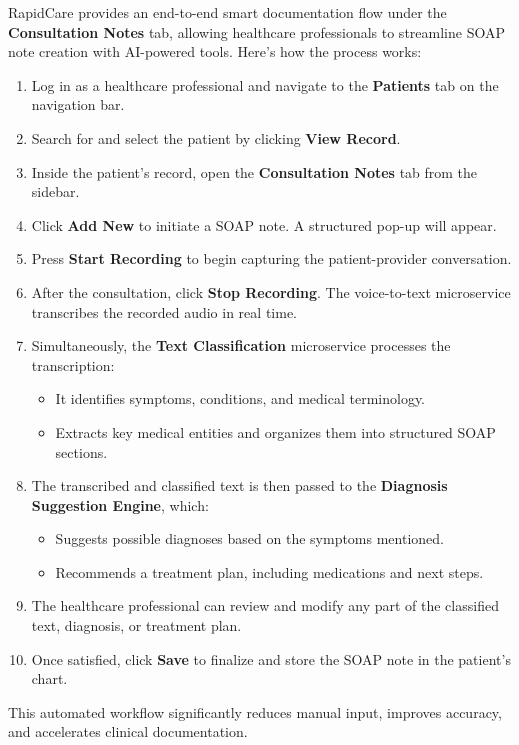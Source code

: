 \documentclass[12pt, titlepage]{article}
\begin{document}
RapidCare provides an end-to-end smart documentation flow under the \textbf{Consultation Notes} tab, allowing healthcare professionals to streamline SOAP note creation with AI-powered tools. Here’s how the process works:

\begin{enumerate}
    \item Log in as a healthcare professional and navigate to the \textbf{Patients} tab on the navigation bar.
    \item Search for and select the patient by clicking \textbf{View Record}.
    \item Inside the patient’s record, open the \textbf{Consultation Notes} tab from the sidebar.
    \item Click \textbf{Add New} to initiate a SOAP note. A structured pop-up will appear.
    \item Press \textbf{Start Recording} to begin capturing the patient-provider conversation.
    \item After the consultation, click \textbf{Stop Recording}. The voice-to-text microservice transcribes the recorded audio in real time.
    \item Simultaneously, the \textbf{Text Classification} microservice processes the transcription:
    \begin{itemize}
        \item It identifies symptoms, conditions, and medical terminology.
        \item Extracts key medical entities and organizes them into structured SOAP sections.
    \end{itemize}
    \item The transcribed and classified text is then passed to the \textbf{Diagnosis Suggestion Engine}, which:
    \begin{itemize}
        \item Suggests possible diagnoses based on the symptoms mentioned.
        \item Recommends a treatment plan, including medications and next steps.
    \end{itemize}
    \item The healthcare professional can review and modify any part of the classified text, diagnosis, or treatment plan.
    \item Once satisfied, click \textbf{Save} to finalize and store the SOAP note in the patient’s chart.
\end{enumerate}

This automated workflow significantly reduces manual input, improves accuracy, and accelerates clinical documentation.
\end{document}
